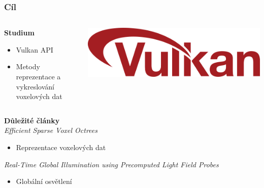 \documentclass[10pt,xcolor=pdflatex,hyperref={unicode}]{beamer}
\begin{document}
\begin{frame}\frametitle{Cíl}
    \begin{columns}
        \hspace{.4cm}
        \begin{column}{0.5\textwidth}
            \textbf{Studium}
            \begin{itemize}
                \item Vulkan API
                \item Metody reprezentace a vykreslování voxelových dat
            \end{itemize}
        \end{column}
        \begin{column}{0.5\textwidth}
            \includegraphics[scale=0.16]{img/Vulkan.png}
        \end{column}
    \end{columns}
    
    \bigbreak
    \bigbreak
    
    \textbf{Důležité články} \\
    \textit{Efficient Sparse Voxel Octrees}
    \begin{itemize}
        \item Reprezentace voxelových dat
    \end{itemize}
    \textit{Real-Time Global Illumination using Precomputed Light Field Probes}
    \begin{itemize}
        \item Globální osvětlení
    \end{itemize}
\end{frame}
\end{document}
